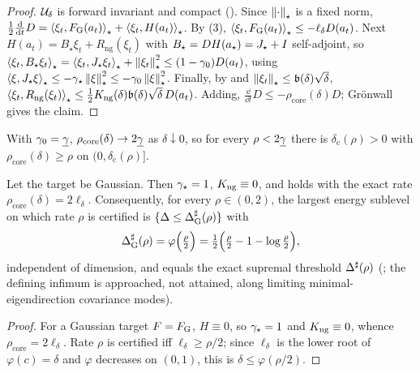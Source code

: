 \begin{proof}
$\mathcal{U}_\delta$ is forward invariant and compact (). Since $\left\lVert \cdot\right\rVert_\star$ is
a fixed norm, $\tfrac12\tfrac{\mathrm{d}}{\mathrm{d} t}D=\left\langle \xi_t,F_{\mathrm G}(a_t)\right\rangle_\star+\left\langle \xi_t,H(a_t)\right\rangle_\star$.
By (3), $\left\langle \xi_t,F_{\mathrm G}(a_t)\right\rangle_\star\leq-\ell_\delta D(a_t)$. Next
$H(a_t)=B_\star\xi_t+R_{\mathrm{ng}}(\xi_t)$ with $B_\star=DH(a_\star)=J_\star+I$ self-adjoint, so
$\left\langle \xi_t,B_\star\xi_t\right\rangle_\star=\left\langle \xi_t,J_\star\xi_t\right\rangle_\star+\left\lVert \xi_t\right\rVert_\star^2\leq(1-\gamma_0)D(a_t)$,
using $\left\langle \xi,J_\star\xi\right\rangle_\star\leq-\gamma_\star\left\lVert \xi\right\rVert_\star^2\leq-\gamma_0\left\lVert \xi\right\rVert_\star^2$. Finally,
by  and $\left\lVert \xi_t\right\rVert_\star\leq\mathfrak b(\delta)\sqrt\delta$,
$\left\langle \xi_t,R_{\mathrm{ng}}(\xi_t)\right\rangle_\star\leq\tfrac12K_{\mathrm{ng}}(\delta)\mathfrak b(\delta)\sqrt\delta\,D(a_t)$.
Adding, $\tfrac{\dd}{\dd t}D\leq-\rho_{\mathrm{core}}(\delta)D$; Gr\"onwall gives the claim.
\end{proof}

\begin{corollary}
\label{cor:core-universal}
With $\gamma_0=\underline{\gamma}$, $\rho_{\mathrm{core}}(\delta)\to2\underline{\gamma}$ as $\delta\downarrow0$, so for every
$\rho<2\underline{\gamma}$ there is $\delta_{\mathrm c}(\rho)>0$ with $\rho_{\mathrm{core}}(\delta)\geq\rho$ on
$(0,\delta_{\mathrm c}(\rho)]$.
\end{corollary}

\begin{corollary}
\label{cor:gauss-sharp}
Let the target be Gaussian. Then $\gamma_\star=1$, $K_{\mathrm{ng}}\equiv0$, and  holds with the
exact rate $\rho_{\mathrm{core}}(\delta)=2\ell_\delta$. Consequently, for every $\rho\in(0,2)$, the
largest energy sublevel on which rate $\rho$ is certified is $\{\Delta\leq\Delta^{\sharp}_{\mathrm G}(\rho)\}$
with
\begin{equation}
\label{eq:gauss-sharp-thresh}
    \Delta^{\sharp}_{\mathrm G}(\rho)=\varphi\Bigl(\tfrac\rho2\Bigr)=\tfrac12\Bigl(\tfrac\rho2-1-\log\tfrac\rho2\Bigr),
\end{equation}
independent of dimension, and equals the exact supremal threshold $\Delta^{\sharp}(\rho)$
(; the defining infimum is approached, not attained, along limiting
minimal-eigendirection covariance modes).
\end{corollary}

\begin{proof}
For a Gaussian target $F=F_{\mathrm G}$, $H\equiv0$, so $\gamma_\star=1$ and $K_{\mathrm{ng}}\equiv0$, whence
$\rho_{\mathrm{core}}=2\ell_\delta$. Rate $\rho$ is certified iff $\ell_\delta\geq\rho/2$; since
$\ell_\delta$ is the lower root of $\varphi(c)=\delta$ and $\varphi$ decreases on $(0,1)$, this is
$\delta\leq\varphi(\rho/2)$.
\end{proof}


